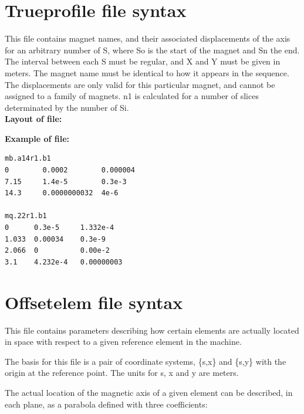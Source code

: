 \section{Trueprofile file syntax}
\label{sec:trueprofile}
This file contains magnet names, and their associated displacements of
the axis for  an arbitrary number of S, where So is the start of the
magnet and Sn the end. The interval between each S must be regular, and
X and Y  must be given in meters. The magnet name must be identical to
how it appears in the  sequence. The displacements are only valid for
this particular magnet, and cannot be  assigned to a family of
magnets. n1 is calculated for a number of slices determinated by the
number of Si. 
\\
{\bf Layout of file:}

{\bf Example of file:}
\begin{verbatim}
mb.a14r1.b1
0        0.0002        0.000004
7.15     1.4e-5        0.3e-3
14.3     0.0000000032  4e-6

mq.22r1.b1
0      0.3e-5     1.332e-4
1.033  0.00034    0.3e-9
2.066  0          0.00e-2
3.1    4.232e-4   0.00000003
\end{verbatim}

\section{Offsetelem file syntax}
\label{sec:offsetelem}
This file contains parameters describing how certain elements are
actually located in space with respect to a given reference element in
the machine.  

The basis for this file is a pair of coordinate systems, \{s,x\} and \{s,y\} 
with the origin at the reference point. The units for s, x and y are
meters.

The actual location of the magnetic axis of a given element can be
described, in each plane, as a parabola defined with three coefficients: 

